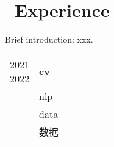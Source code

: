 \documentclass{resume}
\begin{document}
\section{\faUsers\ Experience}
Brief introduction: xxx.


\begin{longtable}{R{\leftcolwidth} | L{\rightcolwidth}}

[0ex][r]{2021 \\*  2022 \\* }  %
& \textbf{cv}\\* 
& nlp \\* 
& \begin{minipage}[t]{\rightcolwidth} data \end{minipage} \\*
& 数据 \\

\end{longtable}

\end{document}
